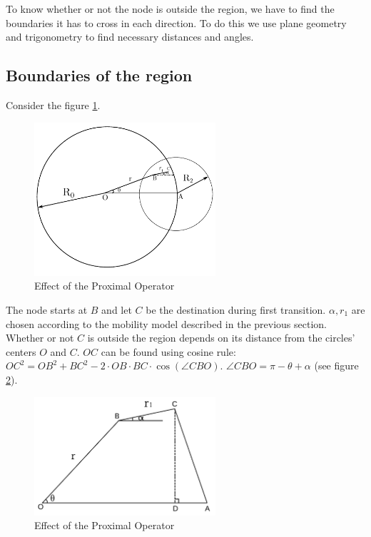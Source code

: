 To know whether or not the node is outside the region, we have to find the boundaries it has to cross in each direction. To do this we use plane geometry and trigonometry to find necessary distances and angles.
\subsection{Boundaries of the region}
Consider the figure \ref{fig:rr1}. 
\begin{figure}[h]
    \centering \vspace{-0.1in}
    \includegraphics[width=0.6\textwidth]{images/geo1.pdf}
    \vspace{-20pt} \caption[Effect of the proximal Operator]{\small Effect of the Proximal Operator }
    \label{fig:rr1}
\end{figure}
The node starts at $B$ and let $C$ be 
the destination during first transition. $\alpha, r_1$ are chosen according to the mobility 
model described in the previous section. Whether or not $C$ is outside the region depends on
its distance from the circles' centers $O$ and $C$. $OC$ can be found using cosine rule:
$OC^2 = OB^2 + BC^2 - 2 \cdot OB \cdot BC \cdot \cos(\angle CBO)$. $\angle CBO = \pi-\theta+\alpha$ (see figure \ref{fig:ocac}).
\begin{figure}[h]
    \centering \vspace{-0.1in}
    \includegraphics[width=0.6\textwidth]{images/geo2.pdf}
    \vspace{-20pt} \caption[Effect of the proximal Operator]{\small Effect of the Proximal Operator }
    \label{fig:ocac}
\end{figure}

